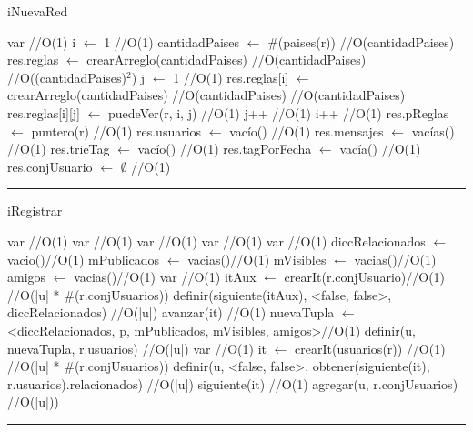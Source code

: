 \begin{algorithm}[H]
\caption{iNuevaRed}
\begin{algorithmic}[1]
\state var \hfill//O(1)
\state i $\gets$ 1 \hfill//O(1)
\state cantidadPaises $\gets$ $\#$(paises(r)) \hfill//O(cantidadPaises)
\state res.reglas $\gets$ crearArreglo(cantidadPaises) \hfill//O(cantidadPaises)
 \hfill//O((cantidadPaises)$^2$)
\state j $\gets$ 1 \hfill//O(1)
\state res.reglas[i] $\gets$ crearArreglo(cantidadPaises) \hfill//O(cantidadPaises)
 \hfill//O(cantidadPaises)
\state res.reglas[i][j] $\gets$ puedeVer(r, i, j) \hfill//O(1)
\state j++ \hfill//O(1)
\endwhile
\state i++ \hfill//O(1)
\endwhile
\state res.pReglas $\gets$ puntero(r) \hfill//O(1)
\state res.usuarios $\gets$ vacío() \hfill//O(1)
\state res.mensajes $\gets$ vacías() \hfill//O(1)
\state res.trieTag $\gets$ vacío() \hfill//O(1)
\state res.tagPorFecha $\gets$ vacía() \hfill//O(1)
\state res.conjUsuario $\gets$ $\emptyset$ \hfill//O(1)
\EndFunction 
\end{algorithmic}
\hrule
{}
\end{algorithm}

\begin{algorithm}[H]
\caption{iRegistrar}
\begin{algorithmic}[1]
\state var \hfill //O(1)
\state var \hfill //O(1)
\state var \hfill //O(1)
\state var \hfill //O(1)
\state var \hfill //O(1)
\state diccRelacionados $\gets$ vacio()\hfill //O(1)
\state mPublicados $\gets$ vacias()\hfill //O(1)
\state mVisibles $\gets$ vacias()\hfill //O(1)
\state amigos $\gets$ vacias()\hfill //O(1)
\state var \hfill //O(1)
\state itAux $\gets$ crearIt(r.conjUsuario)\hfill //O(1)
 \hfill //O(|u| * \#(r.conjUsuarios))
\state definir(siguiente(itAux), <false, false>, diccRelacionados) \hfill //O(|u|)
\state avanzar(it) \hfill //O(1)
\endwhile
\state nuevaTupla $\gets$ <diccRelacionados, p, mPublicados, mVisibles, amigos>\hfill //O(1)
\state definir(u, nuevaTupla, r.usuarios) \hfill//O(|u|)
\state var  \hfill //O(1)
\state it $\gets$ crearIt(usuarios(r)) \hfill //O(1)
 \hfill //O(|u| * \#(r.conjUsuarios))
\state definir(u, <false, false>, obtener(siguiente(it), r.usuarios).relacionados) \hfill //O(|u|)
\state siguiente(it) \hfill //O(1)
\endwhile
\state agregar(u, r.conjUsuarios) \hfill //O(|u|))
\EndFunction 
\end{algorithmic}
\hrule
{}
\end{algorithm}


